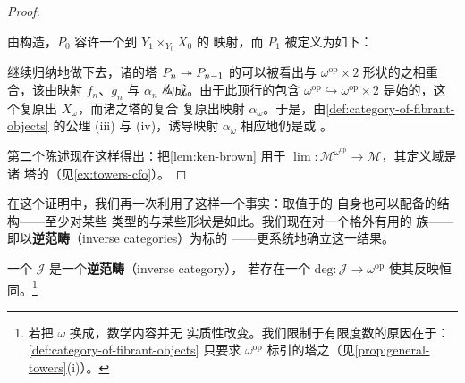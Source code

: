 \begin{proof}
\begin{center}
\end{center}
由构造，$P_0$ 容许一个到\trPullback{} $Y_1\times_{Y_0}X_0$ 的\trCanonical{}%
映射，而 $P_1$ 被定义为如下\trPullback：
\begin{center}
\end{center}
继续归纳地做下去，诸\trFibration{}的塔
$P_n\twoheadrightarrow P_{n-1}$ 的\trLimit{}可以被看出与 $\omega^{\mathrm{op}}\times 2$
形状的\trDiagram{}之\trLimit{}相重合，该\trDiagram{}由映射 $f_n$、$g_n$ 与 $\alpha_n$
构成。由于此\trDiagram{}顶行的包含
$\omega^{\mathrm{op}}\hookrightarrow\omega^{\mathrm{op}}\times 2$
是始的，这个\trLimit{}复原出 $X_\omega$，而诸\trFibration{}之塔的复合
复原出映射 $\alpha_\omega$。于是，由\cref{def:category-of-fibrant-objects}
的公理 (iii) 与 (iv)，诱导映射 $\alpha_\omega$ 相应地仍是\trFibration{}或%
\trTrivialFibration。

第二个陈述现在这样得出：把\cref{lem:ken-brown} 用于\trLimit{}\trFunctor{}
$\lim\colon\mathcal{M}^{\omega^{\mathrm{op}}}\to\mathcal{M}$，其定义域是诸%
\trFibration{}塔的\trCategory{}（见\cref{ex:towers-cfo}）。
\end{proof}

在这个证明中，我们再一次利用了这样一个事实：取值于\trCategoryOfFibrantObjects{}的%
\trDiagram{}\trCategory{}自身也可以配备\trCategoryOfFibrantObjects{}的结构——至少对某些
类型的\trDiagram{}与某些\trDiagram{}形状是如此。我们现在对一个格外有用的%
\trDiagram{}族——即以\textbf{逆范畴}（inverse categories）为标的%
\trDiagram{}——更系统地确立这一结果。

\begin{definition}\label{def:inverse-category}
一个\trCategory{} $\mathcal{J}$ 是一个\textbf{逆范畴}（inverse category），
若存在一个\trFunctor{} $\mathrm{deg}\colon\mathcal{J}\to\omega^{\mathrm{op}}$
使其反映恒同。\footnote{若把 $\omega$ 换成\trOrdinalCategory，数学内容并无
实质性改变。我们限制于有限度数的原因在于：\cref{def:category-of-fibrant-objects}
只要求 $\omega^{\mathrm{op}}$ 标引的塔之\trLimit{}（见\cref{prop:general-towers}(i)）。}
\end{definition}

